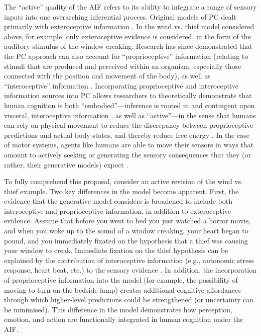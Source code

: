 \begin{CJK}{UTF8}{gbsn}
 The ``active'' quality of the AIF refers to its ability to integrate a range of sensory inputs into one overarching inferential process.  Original models of PC dealt primarily with exteroceptive information \citep[relating to stimuli that are external to an organism, i.e. visual, auditory, haptic perception;][]{Rao1999,Friston2010}.  In the wind vs. thief model considered above, for example, only exteroceptive evidence is considered, in the form of the auditory stimulus of the window creaking.  Research has since demonstrated that the PC approach can also account for ``proprioceptive'' information (relating to stimuli that are produced and perceived within an organism, especially those connected with the position and movement of the body), as well as ``interoceptive'' information  \citep[relating to stimuli produced within an organism, particularly by the body's organs (viscera) e.g., ``gut feelings,'' or elevated heart rate; see][]{Seth2013,FeldmanBarrett2015}.  Incorporating proprioceptive and interoceptive information sources into PC allows researchers to theoretically demonstrate that human cognition is both ``embodied''---inference is rooted in and contingent upon visceral, interoceptive information \citep[][]{Pezzulo2014}, as well as ``active''---in the sense that humans can rely on physical movement to reduce the discrepancy between proprioceptive predictions and actual body states, and thereby reduce free energy \citep[see][]{Friston2010,Clark2015}.  In the case of motor systems, agents like humans are able to move their sensors in ways that amount to actively seeking or generating the sensory consequences that they (or rather, their generative models) expect \citep[][1349]{Friston2003}.

To fully comprehend this proposal, consider an active revision of the wind vs. thief example.  Two key differences in the model become apparent.  First, the evidence that the generative model considers is broadened to include both interoceptive and proprioceptive information, in addition to exteroceptive evidence.  Assume that before you went to bed you just watched a horror movie, and when you woke up to the sound of a window creaking, your heart began to pound, and you immediately fixated on the hypothesis that a thief was causing your window to creak.  Immediate fixation on the thief hypothesis can be explained by the contribution of interoceptive information (e.g., autonomic stress response, heart beat, etc.) to the sensory evidence \citep{Pezzulo2014}.  In addition, the incorporation of proprioceptive information into the model (for example, the possibility of moving to turn on the bedside lamp) creates additional cognitive affordances through which higher-level predictions could be strengthened (or uncertainty can be minimised).  This difference in the model demonstrates how perception, emotion, and action are functionally integrated in human cognition under the AIF.


\end{CJK}
